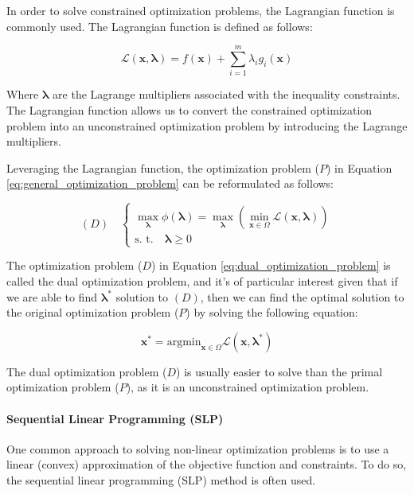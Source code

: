 In order to solve constrained optimization problems, the Lagrangian function is commonly used.
The Lagrangian function is defined as follows:

\begin{equation}
    \mathcal{L}(\bm{x}, \bm{\lambda}) = f(\bm{x}) + \sum_{i=1}^{m} \lambda_i g_i(\bm{x})
    \label{eq:lagrangian_function}
\end{equation}

Where $\bm{\lambda}$ are the Lagrange multipliers associated with the inequality constraints.
The Lagrangian function allows us to convert the constrained optimization problem into an unconstrained optimization problem by introducing the Lagrange multipliers.

Leveraging the Lagrangian function, the optimization problem ($P$) in Equation \ref{eq:general_optimization_problem} can be reformulated as follows:

\begin{equation}
    (D) \quad \begin{cases}
        \max_{\bm{\lambda}} \phi(\bm{\lambda}) = \max_{\bm{\lambda}} \left(\min_{\bm{x} \in \Omega} \mathcal{L}(\bm{x}, \bm{\lambda})\right) \\
        \text{s. t.} \quad \bm{\lambda} \geq 0
    \end{cases}
    \label{eq:dual_optimization_problem}
\end{equation}

The optimization problem ($D$) in Equation \ref{eq:dual_optimization_problem} is called the dual optimization problem, and it's of particular interest given that if we are able to find $\bm{\lambda}^*$ solution to $(D)$, then we can find the optimal solution to the original optimization problem ($P$) by solving the following equation:

\begin{equation}
    \bm{x}^* = \text{argmin}_{\bm{x} \in \Omega} \mathcal{L}(\bm{x}, \bm{\lambda}^*)
    \label{eq:optimal_solution}
\end{equation}

The dual optimization problem ($D$) is usually easier to solve than the primal optimization problem ($P$), as it is an unconstrained optimization problem.

\paragraph{Sequential Linear Programming (SLP)}

One common approach to solving non-linear optimization problems is to use a linear (convex) approximation of the objective function and constraints.
To do so, the sequential linear programming (SLP) method is often used.

